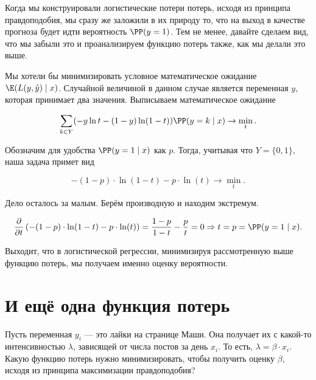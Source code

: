 \documentclass[12pt, a4paper, oneside]{article}
\begin{document}
Когда мы конструировали логистические потери потерь, исходя из принципа правдоподобия, мы сразу же заложили в их природу то, что на выход в качестве прогноза будет идти вероятность $\PP(y = 1)$. Тем не менее, давайте сделаем вид, что мы забыли это и проанализируем функцию потерь также, как мы делали это выше.

Мы хотели бы минимизировать условное математическое ожидание  $\E(L(y, \hat y) \mid x)$. Случайной величиной в данном случае является переменная $y$, которая принимает два значения. Выписываем математическое ожидание

\[
\sum_{k \in Y} (-y \ln t - (1-y) \ln(1-t)) \PP(y = k \mid x) \to \min_t.
\]

Обозначим для удобства $\PP(y = 1 \mid x)$ как $p$. Тогда, учитывая что $Y = \{0,1\}$, наша задача примет вид

\[
-(1-p) \cdot \ln(1-t) - p \cdot \ln(t) \to \min_t.
\]

Дело осталось за малым. Берём производную и находим экстремум.

\begin{multline*}
\frac{\partial }{\partial t} \left(  -(1-p) \cdot \ln(1-t) - p \cdot \ln(t) \right) =  \frac{1-p}{1-t} - \frac{p}{t} = 0   \Rightarrow t = p = \PP(y = 1 \mid x).
\end{multline*}

Выходит, что в логистической регрессии, минимизируя рассмотренную выше функцию потерь, мы получаем именно оценку вероятности. 

\section{И ещё одна функция потерь}

\begin{problem}{}
	Пусть переменная $y_i$ --- это лайки на странице Маши. Она получает их с какой-то интенсивностью $\lambda$, зависящей от числа постов за день $x_i$. То есть, $\lambda = \beta \cdot x_i$. Какую функцию потерь нужно минимизировать, чтобы получить оценку $\beta$, исходя из принципа максимизации правдоподобия?
\end{problem} 
\end{document}

